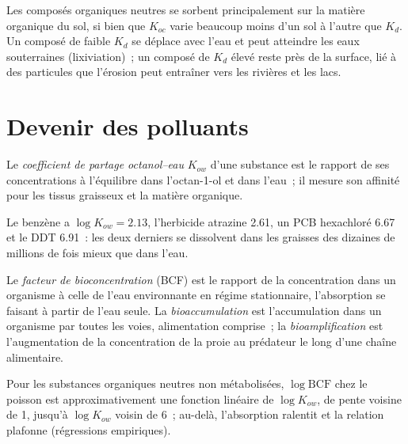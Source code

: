 Les composés organiques neutres se sorbent principalement sur la matière organique du sol, si bien que $K_{oc}$ varie
beaucoup moins d'un sol à l'autre que $K_d$. Un composé de faible $K_d$ se déplace avec l'eau
et peut atteindre les eaux souterraines (lixiviation)~; un composé de $K_d$ élevé reste près de la surface,
lié à des particules que l'érosion peut entraîner vers les rivières et les
lacs.

\section{Devenir des polluants}

\begin{definition}\label{def:b3:environmental-toxicology:kow}
Le \emph{coefficient de partage octanol--eau}
$K_{ow}$ d'une substance est le rapport de ses concentrations à l'équilibre
dans l'octan-1-ol et dans l'eau~; il mesure son affinité pour les tissus
graisseux et la matière organique.
\end{definition}

Le benzène a $\log K_{ow} = 2.13$, l'herbicide atrazine 2.61, un PCB hexachloré 6.67 et
le DDT 6.91~: les deux derniers se dissolvent dans les graisses des dizaines
de millions de fois mieux que dans l'eau.

\begin{definition}[Bioaccumulation]\label{def:b3:environmental-toxicology:bio}
Le \emph{facteur de bioconcentration} (BCF) est le
rapport de la concentration dans un organisme à celle de l'eau environnante
en régime stationnaire, l'absorption se faisant à partir de l'eau seule. La
\emph{bioaccumulation} est l'accumulation dans un
organisme par toutes les voies, alimentation comprise~; la
\emph{bioamplification} est l'augmentation de la
concentration de la proie au prédateur le long d'une chaîne alimentaire.
\end{definition}

\begin{proposition}[BCF et $K_{ow}$]\label{prop:b3:environmental-toxicology:bcf-kow}
Pour les substances organiques neutres non métabolisées, $\log\mathrm{BCF}$ chez le poisson est
approximativement une fonction linéaire de $\log K_{ow}$, de pente voisine de 1, jusqu'à $\log K_{ow}$ voisin de 6~;
au-delà, l'absorption ralentit et la relation plafonne (régressions
empiriques).
\admitted
\end{proposition}

